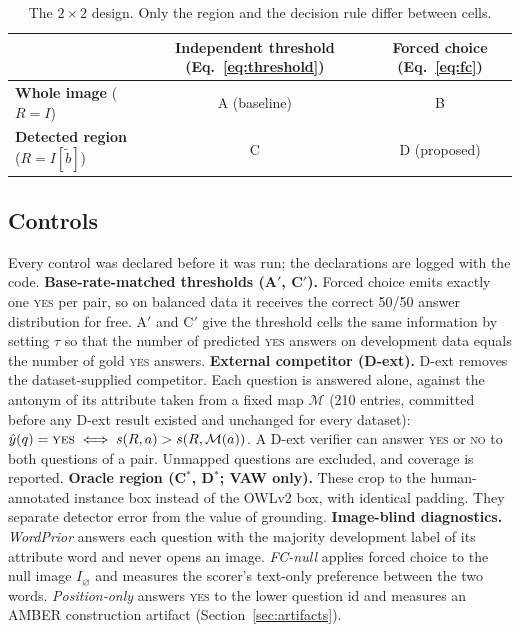 \documentclass[11pt]{article}
\newcommand{\yes}{\textsc{yes}}
\newcommand{\no}{\textsc{no}}
\begin{document}
\begin{table}[!htbp]
\centering
\caption{The $2\times2$ design. Only the region and the decision rule differ between cells.}
\label{tab:design}
\small
\begin{tabular}{lcc}
\toprule
 & \textbf{Independent threshold} (Eq.~\ref{eq:threshold}) & \textbf{Forced choice} (Eq.~\ref{eq:fc}) \\
\midrule
\textbf{Whole image} ($R=I$) & A (baseline) & B \\
\textbf{Detected region} ($R=I[\tilde b]$) & C & D (proposed) \\
\bottomrule
\end{tabular}
\end{table}

\subsection{Controls}\label{sec:dext}
Every control was declared before it was run; the declarations are logged with the code.
\textbf{Base-rate-matched thresholds (A$'$, C$'$).} Forced choice emits exactly one \yes{} per pair, so on balanced data it receives the correct 50/50 answer distribution for free. A$'$ and C$'$ give the threshold cells the same information by setting $\tau$ so that the number of predicted \yes{} answers on development data equals the number of gold \yes{} answers.
\textbf{External competitor (D-ext).} D-ext removes the dataset-supplied competitor. Each question is answered alone, against the antonym of its attribute taken from a fixed map $\mathcal{M}$ (210 entries, committed before any D-ext result existed and unchanged for every dataset): $\hat y(q)=\yes\iff s(R,a)>s(R,\mathcal{M}(a))$. A D-ext verifier can answer \yes{} or \no{} to both questions of a pair. Unmapped questions are excluded, and coverage is reported.
\textbf{Oracle region (C$^{\ast}$, D$^{\ast}$; VAW only).} These crop to the human-annotated instance box instead of the OWLv2 box, with identical padding. They separate detector error from the value of grounding.
\textbf{Image-blind diagnostics.} \emph{WordPrior} answers each question with the majority development label of its attribute word and never opens an image. \emph{FC-null} applies forced choice to the null image $I_{\varnothing}$ and measures the scorer's text-only preference between the two words. \emph{Position-only} answers \yes{} to the lower question id and measures an AMBER construction artifact (Section~\ref{sec:artifacts}).

\end{document}

